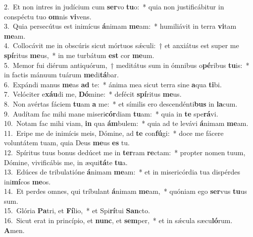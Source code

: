 {2.~}Et non intres in judícium cum \textbf{ser}vo \textbf{tu}o:~* quia non justificábitur in conspéctu tuo \textbf{om}nis \textbf{vi}vens.\\
{3.~}Quia persecútus est inimícus \textbf{á}nimam \textbf{me}am:~* humiliávit in terra \textbf{vi}tam \textbf{me}am.\\
{4.~}Collocávit me in obscúris sicut mórtuos sǽculi:~† et anxiátus est super me \textbf{spí}ritus \textbf{me}us,~* in me turbátum \textbf{est} cor \textbf{me}um.\\
{5.~}Memor fui diérum antiquórum,~† meditátus sum in ómnibus o\textbf{pé}ribus \textbf{tu}is:~* in factis mánuum tuárum \textbf{me}di\textbf{tá}bar.\\
{6.~}Expándi manus \textbf{me}as \textbf{ad} te:~* ánima mea sicut terra sine \textbf{a}qua \textbf{ti}bi.\\
{7.~}Velóciter e\textbf{xáu}di me, \textbf{Dó}mine:~* defécit \textbf{spí}ritus \textbf{me}us.\\
{8.~}Non avértas fáciem \textbf{tu}am \textbf{a} me:~* et símilis ero descendénti\textbf{bus} in \textbf{la}cum.\\
{9.~}Audítam fac mihi mane miseri\textbf{cór}diam \textbf{tu}am:~* quia in \textbf{te} spe\textbf{rá}vi.\\
{10.~}Notam fac mihi viam, \textbf{in} qua \textbf{ám}bulem:~* quia ad te levávi \textbf{á}nimam \textbf{me}am.\\
{11.~}Eripe me de inimícis meis, Dómine, ad \textbf{te} con\textbf{fú}gi:~* doce me fácere voluntátem tuam, quia Deus \textbf{me}us \textbf{es} tu.\\
{12.~}Spíritus tuus bonus dedúcet me in \textbf{ter}ram \textbf{re}ctam:~* propter nomen tuum, Dómine, vivificábis me, in æqui\textbf{tá}te \textbf{tu}a.\\
{13.~}Edúces de tribulatióne \textbf{á}nimam \textbf{me}am:~* et in misericórdia tua dispérdes ini\textbf{mí}cos \textbf{me}os.\\
{14.~}Et perdes omnes, qui tríbulant \textbf{á}nimam \textbf{me}am,~* quóniam ego \textbf{ser}vus \textbf{tu}us sum.\\
{15.~}Glória \textbf{Pa}tri, et \textbf{Fí}lio,~* et Spi\textbf{rí}tui \textbf{San}cto.\\
{16.~}Sicut erat in princípio, et \textbf{nunc}, et \textbf{sem}per,~* et in sǽcula sæcu\textbf{ló}rum. \textbf{A}men.\\
